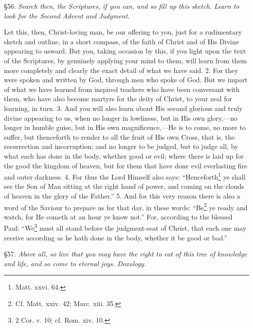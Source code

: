 
§56. \emph{Search then, the Scriptures, if you can, and so fill up this sketch. Learn to look for the Second Advent and Judgment.}

Let this, then, Christ-loving man, be our offering to you, just for a rudimentary sketch and outline, in a short compass, of the faith of Christ and of His Divine appearing to usward. But you, taking occasion by this, if you light upon the text of the Scriptures, by genuinely applying your mind to them, will learn from them more completely and clearly the exact detail of what we have said. 2. For they were spoken and written by God, through men who spoke of God. But we impart of what we have learned from inspired teachers who have been conversant with them, who have also become martyrs for the deity of Christ, to your zeal for learning, in turn. 3. And you will also learn about His second glorious and truly divine appearing to us, when no longer in lowliness, but in His own glory,—no longer in humble guise, but in His own magnificence,—He is to come, no more to suffer, but thenceforth to render to all the fruit of His own Cross, that is, the resurrection and incorruption; and no longer to be judged, but to judge all, by what each has done in the body, whether good or evil; where there is laid up for the good the kingdom of heaven, but for them that have done evil everlasting fire and outer darkness. 4. For thus the Lord Himself also says: “Henceforth\footnote{Matt. xxvi. 64.} ye shall see the Son of Man sitting at the right hand of power, and coming on the clouds of heaven in the glory of the Father.” 5. And for this very reason there is also a word of the Saviour to prepare us for that day, in these words: “Be\footnote{Cf. Matt. xxiv. 42; Marc. xiii. 35.} ye ready and watch, for He cometh at an hour ye know not.” For, according to the blessed Paul: “We\footnote{2 Cor. v. 10; cf. Rom. xiv. 10.} must all stand before the judgment-seat of Christ, that each one may receive according as he hath done in the body, whether it be good or bad.”


§57. \emph{Above all, so live that you may have the right to eat of this tree of knowledge and life, and so come to eternal joys. Doxology.}

